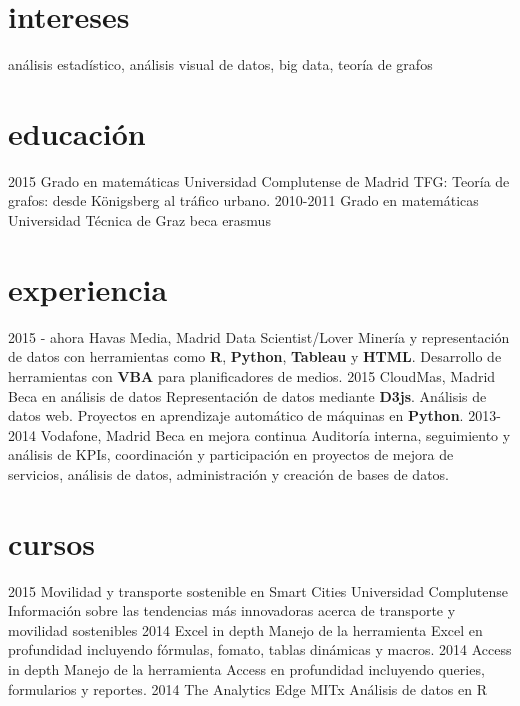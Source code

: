 \documentclass[]{friggeri-cv}
\begin{document}
\section{intereses}

análisis estadístico, análisis visual de datos, big data, teoría de grafos

\section{educación}

\begin{entrylist}
  \entry
    {2015}
    {Grado en matemáticas}
    {Universidad Complutense de Madrid}
    {TFG: Teoría de grafos: desde Königsberg al tráfico urbano.}
  \entry
    {2010-2011}
    {Grado en matemáticas}
    {Universidad Técnica de Graz}
    {beca erasmus}
\end{entrylist}

\section{experiencia}

\begin{entrylist}
  \entry
    {2015 - ahora}
    {Havas Media, Madrid}
    {Data Scientist/Lover}
    {Minería y representación de datos con herramientas como \textbf{R}, \textbf{Python}, \textbf{Tableau} y \textbf{HTML}. Desarrollo de herramientas con \textbf{VBA} para planificadores de medios.}
  \entry
    {2015}
    {CloudMas, Madrid}
    {Beca en análisis de datos}
    {Representación de datos mediante \textbf{D3js}. Análisis de datos web. Proyectos en aprendizaje automático de máquinas en \textbf{Python}.}
  \entry
    {2013-2014}
    {Vodafone, Madrid}
    {Beca en mejora continua}
    {Auditoría interna, seguimiento y análisis de KPIs, coordinación y participación en proyectos de mejora de servicios, análisis de datos, administración y creación de bases de datos.}
\end{entrylist}

\section{cursos}

\begin{entrylist}
  \entry
    {2015}
    {Movilidad y transporte sostenible en Smart Cities}
    {Universidad Complutense}
    {Información sobre las tendencias más innovadoras acerca de transporte y movilidad sostenibles}
  \entry
    {2014}
    {Excel in depth}
    {}
    {Manejo de la herramienta Excel en profundidad incluyendo fórmulas, fomato, tablas dinámicas y macros.}
  \entry
    {2014}
    {Access in depth}
    {}
    {Manejo de la herramienta Access en profundidad incluyendo queries, formularios y reportes.}
  \entry
    {2014}
    {The Analytics Edge}
    {MITx}
    {Análisis de datos en R}
\end{entrylist}
\end{document}
